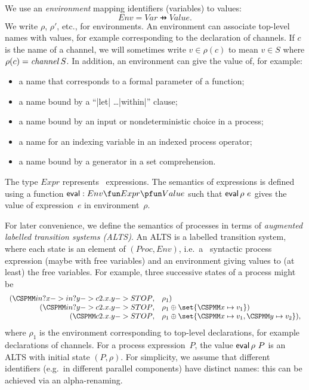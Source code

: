 We use an \emph{environment} mapping identifiers (variables) to values:
\[
Env = Var \pfun Value.
\]
We write $\rho$, $\rho'$, etc., for environments.  An environment can
associate top-level names with values, for example corresponding to the
declaration of channels.  If $c$ is the name of a channel, we will sometimes
write $v \in \rho(c)$ to mean $v \in S$ where $\rho(c) = \mathop{\it channel} S$.
In addition, an environment can give the value of, for example:
%
\begin{itemize}
\item a name that corresponds to a formal parameter of a function;
\item a name bound by a ``|let| \ldots |within|'' clause;
\item a name bound by an input or nondeterministic choice in a process;
\item a name for an indexing variable in an indexed process operator;
\item a name bound by a generator in a set comprehension.
\end{itemize}


The type $Expr$ represents \CSPm\ expressions.  The semantics of expressions is
defined using a function $\eval : Env \fun Expr \pfun Value$ such that
$\mathop{\sf eval} \rho~e$ gives the value of expression~$e$ in environment~$\rho$.

For later convenience, we define the semantics of processes in terms of
\emph{augmented labelled transition systems (ALTS)}.  An ALTS is a labelled
transition system, where each state is an element of $(Proc, Env)$, i.e.~a
\CSPm\ syntactic process expression (maybe with free variables) and an
environment giving values to (at least) the free variables.  For example,
three successive states of a process might be
\[
\begin{array}{rl}
(\M{in?x -> in?y -> c2.x.y -> STOP}, & \rho_1) \\
(\M{in?y -> c2.x.y -> STOP}, & \rho_1 \oplus \set{\M{x} \mapsto v_1}) \\
(\M{c2.x.y -> STOP}, & \rho_1 \oplus \set{\M x \mapsto v_1, \M y \mapsto v_2}),
\end{array}
\]
where $\rho_1$ is the environment corresponding to top-level declarations, for
example declarations of channels.  For a process expression~$P$, the value
$\mathop{\sf eval} \rho~P$ is an ALTS with initial state $(P,\rho)$.  For simplicity, we
assume that different identifiers (e.g.~in different parallel components) have
distinct names: this can be achieved via an alpha-renaming.

